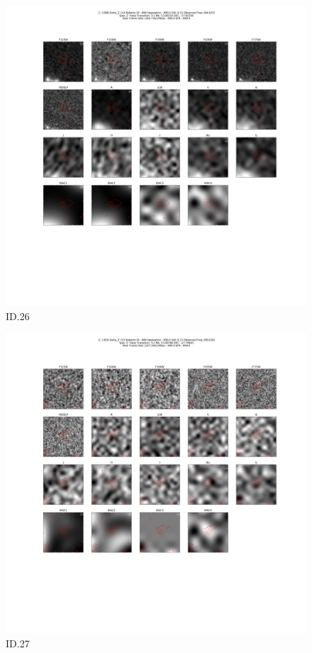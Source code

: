 \begin{figure}[tbp]
\centering \includegraphics[width=120mm]{Matched/ASPECS_Cutout_26.png}
\caption{ID.26}
\label{fig:Match_Three}
\end{figure}

\begin{figure}[tbp]
\centering \includegraphics[width=120mm]{Matched/ASPECS_Cutout_27.png}
\caption{ID.27}
\label{fig:Match_Three}
\end{figure}

